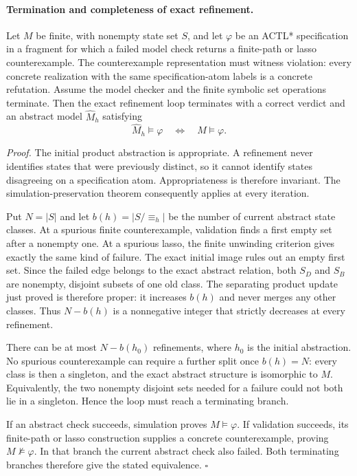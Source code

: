 \paragraph{Termination and completeness of exact refinement.}
Let \(M\) be finite, with nonempty state set \(S\), and let \(\varphi\)
be an ACTL* specification in a fragment for which a failed model check
returns a finite-path or lasso counterexample. The counterexample
representation must witness violation: every concrete realization with
the same specification-atom labels is a concrete refutation.
Assume the model checker and the finite symbolic set operations terminate.
Then the exact refinement loop terminates with a correct verdict and an
abstract model \(\widehat M_h\) satisfying
\[
 \widehat M_h\models\varphi
 \quad\Longleftrightarrow\quad
 M\models\varphi.
\]

\emph{Proof.}
The initial product abstraction is appropriate. A refinement never
identifies states that were previously distinct, so it cannot identify
states disagreeing on a specification atom. Appropriateness is therefore
invariant. The simulation-preservation theorem consequently applies at
every iteration.

Put \(N=|S|\) and let \(b(h)=|S/{\equiv_h}|\) be the number of current
abstract state classes. At a spurious finite counterexample, validation
finds a first empty set after a nonempty one. At a spurious lasso, the
finite unwinding criterion gives exactly the same kind of failure.
The exact initial image rules out an empty first set. Since the failed
edge belongs to the exact abstract relation, both \(S_D\) and \(S_B\)
are nonempty, disjoint subsets of one old class. The separating product
update just proved is therefore proper: it increases \(b(h)\) and
never merges any other classes. Thus \(N-b(h)\) is a nonnegative
integer that strictly decreases at every refinement.

There can be at most \(N-b(h_0)\) refinements, where \(h_0\) is the
initial abstraction. No spurious counterexample can require a further
split once \(b(h)=N\): every class is then a singleton, and the exact
abstract structure is isomorphic to \(M\). Equivalently, the two
nonempty disjoint sets needed for a failure could not both lie in a
singleton. Hence the loop must reach a terminating branch.

If an abstract check succeeds, simulation proves \(M\models\varphi\).
If validation succeeds, its finite-path or lasso construction supplies
a concrete counterexample, proving \(M\not\models\varphi\). In that
branch the current abstract check also failed. Both terminating branches
therefore give the stated equivalence. \(\square\)

